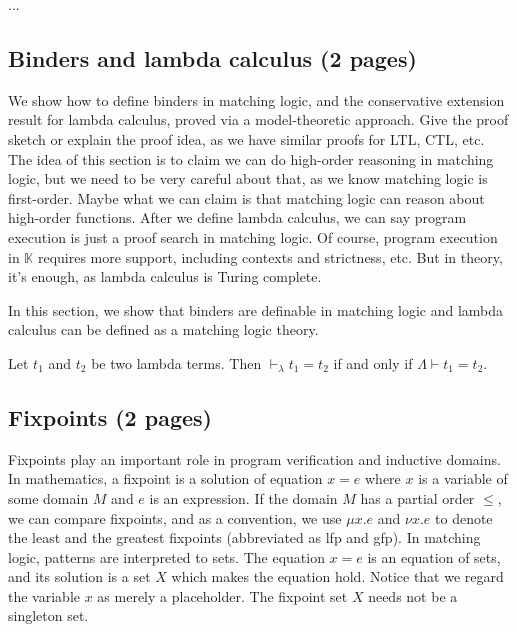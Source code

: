 \documentclass[acmsmall,review,anonymous]{acmart}
\newcommand{\K}{$\mathbb{K}$\xspace}
\newcommand{\MLLambda}{\mathsf{\Lambda}}
\begin{document}
...

\subsection{Binders and lambda calculus (2 pages)}

We show how to define binders in matching logic, and
the conservative extension result for lambda calculus,
proved via a model-theoretic approach.
Give the proof sketch or explain the proof idea,
as we have similar proofs for LTL, CTL, etc.
The idea of this section is to claim we can do high-order reasoning
in matching logic, but we need to be very careful about that,
as we know matching logic is first-order.
Maybe what we can claim is that matching logic can reason about high-order functions.
After we define lambda calculus, we can say program execution is just a proof search
in matching logic.
Of course, program execution in \K requires more support, including contexts and strictness,
etc. 
But in theory, it's enough, as lambda calculus is Turing complete.


In this section, we show that binders are definable in matching logic and
lambda calculus can be defined as a matching logic theory.
\begin{theorem}
Let $t_1$ and $t_2$ be two lambda terms. Then
$\vdash_\lambda t_1 = t_2$ if and only if
$\MLLambda \vdash t_1 = t_2$.
\end{theorem}

\subsection{Fixpoints (2 pages)}

Fixpoints play an important role in program verification and inductive domains.
In mathematics, a fixpoint is a solution of equation $x = e$ where $x$ is a variable
of some domain $M$ and $e$ is an expression.
If the domain $M$ has a partial order $\le$,
we can compare fixpoints, and as a convention,
we use $\mu x . e$ and $\nu x . e$ to denote the least and the greatest fixpoints 
(abbreviated as lfp and gfp).
In matching logic, patterns are interpreted to sets.
The equation $x = e$ is an equation of sets, and its solution
is a set $X$ which makes the equation hold.
Notice that we regard the variable $x$ as merely a placeholder.
The fixpoint set $X$ needs not be a singleton set.
\end{document}
